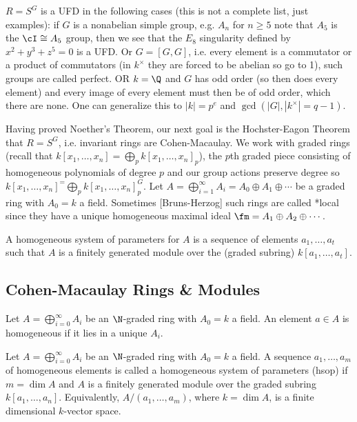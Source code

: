 \begin{ex}
$R= S^G$ is a UFD in the following cases (this is not a complete list, just examples): if $G$ is a nonabelian simple group, e.g. $A_n$ for $n \geq 5$ note that $A_5$ is the $\cI \cong A_5$ group, then we see that the $E_8$ singularity defined by $x^2+y^3+z^5=0$ is a UFD. Or $G= [G,G]$, i.e. every element is a commutator or a product of commutators (in $k^\times$ they are forced to be abelian so go to 1), such groups are called perfect. OR $k= \Q$ and $G$ has odd order (so then does every element) and every image of every element must then be of odd order, which there are none. One can generalize this to $|k|= p^e$ and $\gcd(|G|,|k^\times|=q-1)$. 
\end{ex}


Having proved Noether's Theorem, our next goal is the Hochster-Eagon Theorem that $R= S^G$, i.e. invariant rings are Cohen-Macaulay. We work with graded rings (recall that $k[x_1,\ldots,x_n]= \bigoplus_p k[x_1,\ldots,x_n]_p$), the $p$th graded piece consisting of homogeneous polynomials of degree $p$ and our group actions preserve degree so $k[x_1,\ldots,x_n]^= \bigoplus_p k[x_1,\ldots,x_n]_p^G$. Let $A= \bigoplus_{i=1}^\infty A_i= A_0 \oplus A_1 \oplus \cdots$ be a graded ring with $A_0= k$ a field. Sometimes [Bruns-Herzog] such rings are called *local since they have a unique homogeneous maximal ideal $\fm= A_1 \oplus A_2 \oplus \cdots$. 


\begin{dfn}
A homogeneous system of parameters for $A$ is a sequence of elements $a_1,\ldots,a_t$ such that $A$ is a finitely generated module over the (graded subring) $k[a_1,\ldots,a_t]$. 
\end{dfn}








\subsection{Cohen-Macaulay Rings \& Modules}

\begin{dfn}[Homogeneous]
Let $A= \bigoplus_{i=0}^\infty A_i$ be an $\N$-graded ring with $A_0=k$ a field. An element $a \in A$ is homogeneous if it lies in a unique $A_i$.
\end{dfn}


\begin{dfn}
Let $A= \bigoplus_{i=0}^\infty A_i$ be an $\N$-graded ring with $A_0=k$ a field. A sequence $a_1,\ldots,a_m$ of homogeneous elements is called a homogeneous system of parameters (hsop) if $m = \dim A$ and $A$ is a finitely generated module over the graded subring $k[a_1,\ldots,a_n]$. Equivalently, $A/(a_1,\ldots,a_m)$, where $k= \dim A$, is a finite dimensional $k$-vector space. 
\end{dfn}


